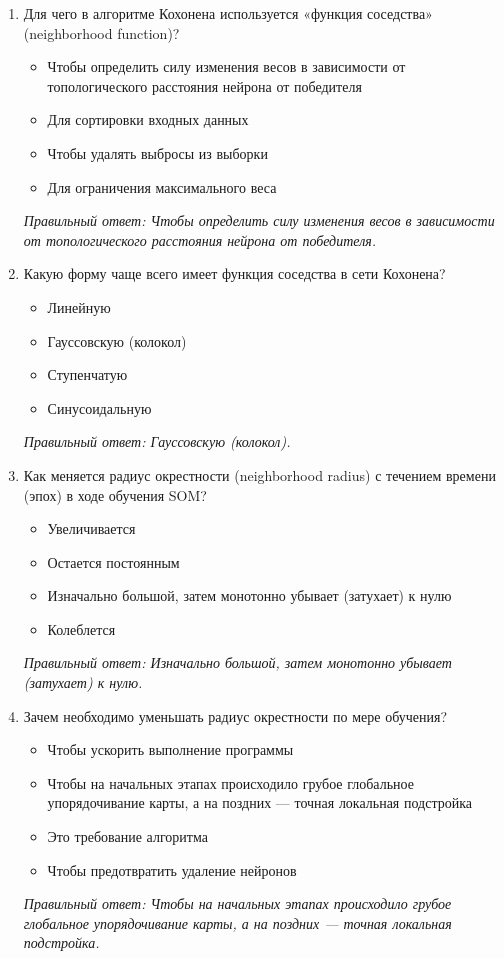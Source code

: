 \begin{enumerate}[label=\textbf{\arabic*.}, leftmargin=0pt, itemsep=1.2em]
\item Для чего в алгоритме Кохонена используется «функция соседства» (neighborhood function)?
\begin{itemize}[label=$\square$, leftmargin=1.5cm, itemsep=0.2em, topsep=0.3em]
\item Чтобы определить силу изменения весов в зависимости от топологического расстояния нейрона от победителя
\item Для сортировки входных данных
\item Чтобы удалять выбросы из выборки
\item Для ограничения максимального веса
\end{itemize}
{\small\textit{Правильный ответ: Чтобы определить силу изменения весов в зависимости от топологического расстояния нейрона от победителя.}}

\item Какую форму чаще всего имеет функция соседства в сети Кохонена?
\begin{itemize}[label=$\square$, leftmargin=1.5cm, itemsep=0.2em, topsep=0.3em]
\item Линейную
\item Гауссовскую (колокол)
\item Ступенчатую
\item Синусоидальную
\end{itemize}
{\small\textit{Правильный ответ: Гауссовскую (колокол).}}

\item Как меняется радиус окрестности (neighborhood radius) с течением времени (эпох) в ходе обучения SOM?
\begin{itemize}[label=$\square$, leftmargin=1.5cm, itemsep=0.2em, topsep=0.3em]
\item Увеличивается
\item Остается постоянным
\item Изначально большой, затем монотонно убывает (затухает) к нулю
\item Колеблется
\end{itemize}
{\small\textit{Правильный ответ: Изначально большой, затем монотонно убывает (затухает) к нулю.}}

\item Зачем необходимо уменьшать радиус окрестности по мере обучения?
\begin{itemize}[label=$\square$, leftmargin=1.5cm, itemsep=0.2em, topsep=0.3em]
\item Чтобы ускорить выполнение программы
\item Чтобы на начальных этапах происходило грубое глобальное упорядочивание карты, а на поздних — точная локальная подстройка
\item Это требование алгоритма
\item Чтобы предотвратить удаление нейронов
\end{itemize}
{\small\textit{Правильный ответ: Чтобы на начальных этапах происходило грубое глобальное упорядочивание карты, а на поздних — точная локальная подстройка.}}


\end{enumerate}
